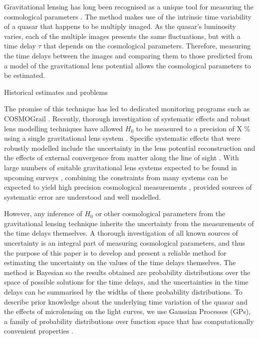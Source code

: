 \documentclass[useAMS,usenatbib, a4paper]{mn2e} \usepackage{natbib}
\begin{document}
Gravitational lensing has long been recognised as a unique tool for measuring
the cosmological parameters \citep{schechter}. The method makes use of the
intrinsic time variability of a quasar that happens to be multiply imaged. As
the quasar's luminosity varies, each of the multiple images presents the same
fluctuations, but with a time delay $\tau$ that depends on the cosmological
parameters. Therefore, measuring the time delays between the images and
comparing them to those predicted from a model of the gravitational lens
potential allows the cosmological parameters to be estimated.

Historical estimates and problems

The promise of this technique has led to dedicated monitoring programs such as
COSMOGrail \citep[][]{2005A&A...436...25E, 2008A&A...488..481V}. Recently,
thorough investigation of systematic effects and robust lens modelling
techniques have allowed $H_0$ to be measured to a precision of X \% using a
single gravitational lens system \citep{2010ApJ...711..201S}. Specific
systematic effects that were robustly modelled include the uncertainty in the
lens potential reconstruction \citep{2009ApJ...691..277S} and the effects of
external convergence from matter along the line of sight
\citep{2006ApJ...642...30F, 2010ApJ...711..201S}. With large numbers of
suitable gravitational lens systems expected to be found in upcoming surveys
\citep{2010MNRAS.405.2579O}, combining the constraints from many systems can
be expected to yield high precision cosmological measurements
\citep{2010ApJ...712.1378P}, provided sources of systematic error are
understood and well modelled.

However, any inference of $H_0$ or other cosmological parameters
from the gravitational lensing technique inherits
the uncertainty from the measurements of the time delays themselves. A
thorough investigation of all known sources of uncertainty is an integral part
of measuring cosmological parameters, and thus the purpose of this paper is to
develop and present a reliable method for estimating the uncertainty on the
values of the time delays themselves. The method is Bayesian
\citep{2004kats.book.....O} so the results obtained are probability
distributions over the space of possible solutions for the time delays, and the
uncertainties in the time delays
can be summarised by the widths of these probability distributions. To describe
prior knowledge about the underlying time variation of the quasar and the
effects of microlensing on
the light curves, we use Gaussian Processes (GPs), a family of probability
distributions over function space that has computationally convenient
properties \citep{rasmussen}.
\end{document}
